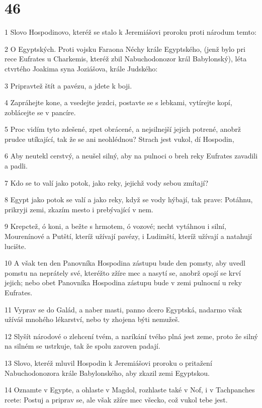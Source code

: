 \chapter{46}

\par 1 Slovo Hospodinovo, kteréž se stalo k Jeremiášovi proroku proti národum temto:
\par 2 O Egyptských. Proti vojsku Faraona Néchy krále Egyptského, (jenž bylo pri rece Eufrates u Charkemis, kteréž zbil Nabuchodonozor král Babylonský), léta ctvrtého Joakima syna Joziášova, krále Judského:
\par 3 Pripravtež štít a pavézu, a jdete k boji.
\par 4 Zapráhejte kone, a vsedejte jezdci, postavte se s lebkami, vytírejte kopí, zoblácejte se v pancíre.
\par 5 Proc vidím tyto zdešené, zpet obrácené, a nejsilnejší jejich potrené, anobrž prudce utíkající, tak že se ani neohlédnou? Strach jest vukol, dí Hospodin,
\par 6 Aby neutekl cerstvý, a neušel silný, aby na pulnoci o breh reky Eufrates zavadili a padli.
\par 7 Kdo se to valí jako potok, jako reky, jejichž vody sebou zmítají?
\par 8 Egypt jako potok se valí a jako reky, když se vody hýbají, tak prave: Potáhnu, prikryji zemi, zkazím mesto i prebývající v nem.
\par 9 Krepctež, ó koni, a bežte s hrmotem, ó vozové; necht vytáhnou i silní, Mourenínové a Putští, kteríž užívají pavézy, i Ludimští, kteríž užívají a natahují lucište.
\par 10 A však ten den Panovníka Hospodina zástupu bude den pomsty, aby uvedl pomstu na neprátely své, kteréžto zžíre mec a nasytí se, anobrž opojí se krví jejich; nebo obet Panovníka Hospodina zástupu bude v zemi pulnocní u reky Eufrates.
\par 11 Vyprav se do Galád, a naber masti, panno dcero Egyptská, nadarmo však užíváš mnohého lékarství, nebo ty zhojena býti nemužeš.
\par 12 Slyšít národové o zlehcení tvém, a naríkání tvého plná jest zeme, proto že silný na silném se ustrkuje, tak že spolu zaroven padají.
\par 13 Slovo, kteréž mluvil Hospodin k Jeremiášovi proroku o pritažení Nabuchodonozora krále Babylonského, aby zkazil zemi Egyptskou.
\par 14 Oznamte v Egypte, a ohlaste v Magdol, rozhlaste také v Nof, i v Tachpanches rcete: Postuj a priprav se, ale však zžíre mec všecko, což vukol tebe jest.
